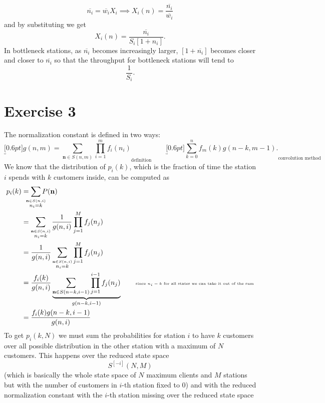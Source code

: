 \documentclass[12pt]{article}
\begin{document}
	\begin{equation*}
		\overline{n_{i}}=\overline{w_i}X_i\implies X_i(n)=\frac{\overline{n_i}}{\overline{w_i}}
	\end{equation*}
	and by substituting we get
	\begin{equation*}
		X_i(n)=\frac{\overline{n_{i}}}{S_i[1+n_i]}.
	\end{equation*}
	In bottleneck stations, as $\overline{n_{i}}$ becomes increasingly larger, $[1+\overline{n_i}]$ becomes closer and closer to $\overline{n_{i}}$ so that the throughput for bottleneck stations will tend to
	\begin{equation*}
		\frac{1}{S_i}.
	\end{equation*}
	\section*{Exercise 3}
	The normalization constant is defined in two ways:
	\begin{equation*}
		\underbracket[0.6pt]{g(n,m)=\sum_{\mathbf{n}\in S(n,m)}\prod_{i=1}^{m}f_i(n_i)}_{\text{definition}}\qquad\underbracket[0.6pt]{\sum_{k=0}^{n}f_{m}(k)g(n-k,m-1).}_{\text{convolution method}}
	\end{equation*}
	We know that the distribution of $p_i(k)$, which is the fraction of time the station $i$ spends with $k$ customers inside, can be computed as
	\begin{align*}
		p_i(k)&=\sum_{\mathclap{\stackrel{\mathbf{n}\in S(n,i)}{n_i=k}}}P(\mathbf{n})\\
		&=\sum_{\stackrel{\mathbf{n}\in S(n,i)}{n_i=k}}\frac{1}{g(n,i)}\prod_{j=1}^{M}f_j(n_j)\\
		&=\frac{1}{g(n,i)}\sum_{\stackrel{\mathbf{n}\in S(n,i)}{n_i=k}}\prod_{j=1}^{M}f_j(n_j)\\
		&=\frac{f_i(k)}{g(n,i)}\underbrace{\sum_{\mathbf{n}\in S(n-k,i-1)}\prod_{j=1}^{i-1}f_j(n_j)}_{g(n-k,i-1)}\qquad\text{\tiny since $n_i=k$ for all states we can take it out of the sum}\\
		&=\frac{f_i(k)g(n-k,i-1)}{g(n,i)}
	\end{align*}
	To get $p_i(k,N)$ we must sum the probabilities for station $i$ to have $k$ customers over all possible distribution in the other station with a maximum of $N$ customers. This happens over the reduced state space 
	\begin{equation*}
		S^{[-i]}(N,M)
	\end{equation*}
	(which is basically the whole state space of $N$ maximum clients and $M$ stations but with the number of customers in $i$-th station fixed to 0) and with the reduced normalization constant with the $i$-th station missing over the reduced state space
\end{document}
